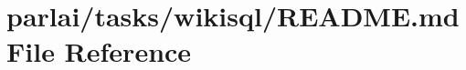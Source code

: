 \hypertarget{parlai_2tasks_2wikisql_2README_8md}{}\section{parlai/tasks/wikisql/\+R\+E\+A\+D\+ME.md File Reference}
\label{parlai_2tasks_2wikisql_2README_8md}
